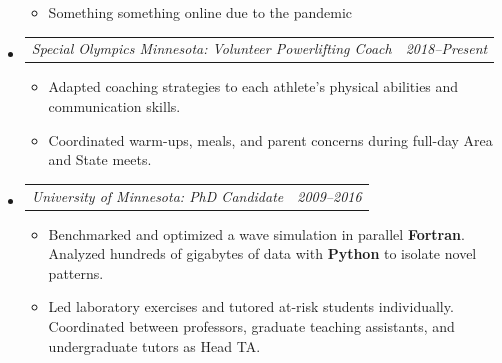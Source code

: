 \documentclass[12pt,letterpaper]{article}
\makeatletter
\newcommand{\headerpair}[2]{
    \begin{tabular*}{\linewidth}{l@{ \extracolsep{\fill} }r} {\large\emph{#1}} & {\large\emph{#2}}
    \end{tabular*}
}
\newcommand{\headerrow}[3]{\headerpair{#2: #1}{#3}}
\makeatother
\begin{document}
\begin{itemize}[leftmargin=\parindent]
\begin{itemize}[leftmargin=\parindent]
            \item Something something online due to the pandemic

        \end{itemize}


    \item[]
        \headerrow
            {Volunteer Powerlifting Coach}
            {Special Olympics Minnesota}
            {2018--Present}
        \begin{itemize}[leftmargin=\parindent]

            \item Adapted coaching strategies to each athlete's physical abilities and communication skills.

            \item Coordinated warm-ups, meals, and parent concerns during full-day Area and State meets.




        \end{itemize}

    \item[]
        \headerrow
            {PhD Candidate}
            {University of Minnesota}
            {2009--2016}
        \begin{itemize}[leftmargin=\parindent]
            \item Benchmarked and optimized a wave simulation in parallel \textbf{Fortran}. Analyzed hundreds of gigabytes of data with \textbf{Python} to isolate novel patterns.

            \item Led laboratory exercises and tutored at-risk students individually. Coordinated between professors, graduate teaching assistants, and undergraduate tutors as Head TA.
        \end{itemize}

\end{itemize}
\end{document}
